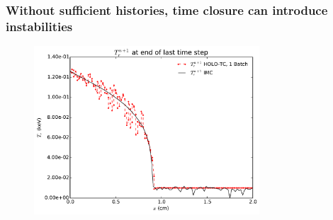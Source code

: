 \documentclass[xcolor=dvipsnames,hyperref={pdfpagelabels=false},unknownkeysallowed]{beamer}
\begin{document}
\begin{frame}
    \frametitle{Without sufficient histories, time closure can introduce instabilities}
\begin{figure}
    \centering
    \includegraphics[width=0.75\textwidth]{thin_30k_fails.pdf}
\end{figure}
\end{frame}
\end{document}
